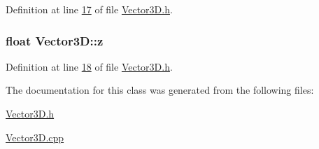 Definition at line \hyperlink{_vector3_d_8h_source_l00017}{17} of file \hyperlink{_vector3_d_8h_source}{Vector3\+D.\+h}.

\hypertarget{class_vector3_d_af9728f1eba23b9ee091755346214f391}{}
\subsubsection[{z}]{\setlength{\rightskip}{0pt plus 5cm}float Vector3\+D\+::z\hspace{0.3cm}{\ttfamily [protected]}}\label{class_vector3_d_af9728f1eba23b9ee091755346214f391}


Definition at line \hyperlink{_vector3_d_8h_source_l00018}{18} of file \hyperlink{_vector3_d_8h_source}{Vector3\+D.\+h}.



The documentation for this class was generated from the following files\+:\begin{DoxyCompactItemize}
\item 
\hyperlink{_vector3_d_8h}{Vector3\+D.\+h}\item 
\hyperlink{_vector3_d_8cpp}{Vector3\+D.\+cpp}\end{DoxyCompactItemize}
